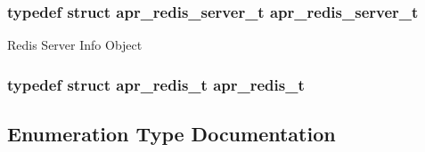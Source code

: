 \subsubsection[{\texorpdfstring{apr\+\_\+redis\+\_\+server\+\_\+t}{apr_redis_server_t}}]{\setlength{\rightskip}{0pt plus 5cm}typedef struct {\bf apr\+\_\+redis\+\_\+server\+\_\+t} {\bf apr\+\_\+redis\+\_\+server\+\_\+t}}\hypertarget{group__APR__Util__RC_ga02345ba6c8fb432d89c74b971473f3e3}{}\label{group__APR__Util__RC_ga02345ba6c8fb432d89c74b971473f3e3}
Redis Server Info Object 
\subsubsection[{\texorpdfstring{apr\+\_\+redis\+\_\+t}{apr_redis_t}}]{\setlength{\rightskip}{0pt plus 5cm}typedef struct {\bf apr\+\_\+redis\+\_\+t} {\bf apr\+\_\+redis\+\_\+t}}\hypertarget{group__APR__Util__RC_ga133584a8de2b03e2538a8a1f8d506173}{}\label{group__APR__Util__RC_ga133584a8de2b03e2538a8a1f8d506173}


\subsection{Enumeration Type Documentation}
